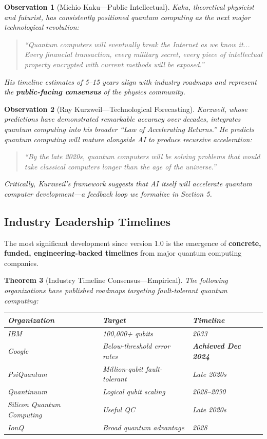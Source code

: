 \documentclass[11pt,a4paper]{article}
\newtheorem{theorem}{Theorem}[section]
\newtheorem{observation}[theorem]{Observation}
\begin{document}
\begin{observation}[Michio Kaku---Public Intellectual]
Kaku, theoretical physicist and futurist, has consistently positioned quantum computing as the next major technological revolution:
\begin{quote}
\textit{``Quantum computers will eventually break the Internet as we know it... Every financial transaction, every military secret, every piece of intellectual property encrypted with current methods will be exposed.''}
\end{quote}
His timeline estimates of 5--15 years align with industry roadmaps and represent the \textbf{public-facing consensus} of the physics community.
\end{observation}

\begin{observation}[Ray Kurzweil---Technological Forecasting]
Kurzweil, whose predictions have demonstrated remarkable accuracy over decades, integrates quantum computing into his broader ``Law of Accelerating Returns.'' He predicts quantum computing will mature alongside AI to produce recursive acceleration:
\begin{quote}
\textit{``By the late 2020s, quantum computers will be solving problems that would take classical computers longer than the age of the universe.''}
\end{quote}
Critically, Kurzweil's framework suggests that AI itself will accelerate quantum computer development---a feedback loop we formalize in Section 5.
\end{observation}

\subsection{Industry Leadership Timelines}

The most significant development since version 1.0 is the emergence of \textbf{concrete, funded, engineering-backed timelines} from major quantum computing companies.

\begin{theorem}[Industry Timeline Consensus---Empirical]
The following organizations have published roadmaps targeting fault-tolerant quantum computing:
\begin{center}
\begin{tabular}{lll}
\toprule
\textbf{Organization} & \textbf{Target} & \textbf{Timeline} \\
\midrule
IBM & 100,000+ qubits & 2033 \\
Google & Below-threshold error rates & \textbf{Achieved Dec 2024} \\
PsiQuantum & Million-qubit fault-tolerant & Late 2020s \\
Quantinuum & Logical qubit scaling & 2028--2030 \\
Silicon Quantum Computing & Useful QC & Late 2020s \\
IonQ & Broad quantum advantage & 2028 \\
\bottomrule
\end{tabular}
\end{center}
\end{theorem}
\end{document}
